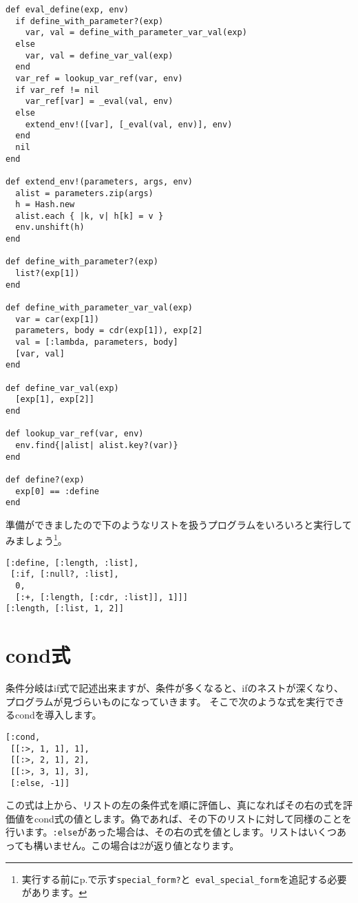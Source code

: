 \begin{lstlisting}
def eval_define(exp, env)
  if define_with_parameter?(exp)
    var, val = define_with_parameter_var_val(exp)
  else
    var, val = define_var_val(exp)
  end
  var_ref = lookup_var_ref(var, env)
  if var_ref != nil
    var_ref[var] = _eval(val, env)
  else
    extend_env!([var], [_eval(val, env)], env)
  end
  nil
end

def extend_env!(parameters, args, env)
  alist = parameters.zip(args)
  h = Hash.new
  alist.each { |k, v| h[k] = v }
  env.unshift(h)
end

def define_with_parameter?(exp)
  list?(exp[1])
end

def define_with_parameter_var_val(exp)
  var = car(exp[1])
  parameters, body = cdr(exp[1]), exp[2]
  val = [:lambda, parameters, body]
  [var, val]
end

def define_var_val(exp)
  [exp[1], exp[2]]
end

def lookup_var_ref(var, env)
  env.find{|alist| alist.key?(var)}
end  

def define?(exp)
  exp[0] == :define
end
\end{lstlisting}

準備ができましたので下のようなリストを扱うプログラムをいろいろと実行してみましょう\footnote{実行する前にp.\pageref{sec:quote}で示す{\tt special\_form?}と{\tt 
eval\_special\_form}を追記する必要があります。}。

\begin{lstlisting}
[:define, [:length, :list], 
 [:if, [:null?, :list], 
  0, 
  [:+, [:length, [:cdr, :list]], 1]]]
[:length, [:list, 1, 2]]
\end{lstlisting}

\section{cond式}

条件分岐はif式で記述出来ますが、条件が多くなると、ifのネストが深くなり、プログラムが見づらいものになっていきます。
そこで次のような式を実行できるcondを導入します。

\begin{lstlisting}
[:cond, 
 [[:>, 1, 1], 1],
 [[:>, 2, 1], 2],
 [[:>, 3, 1], 3],
 [:else, -1]]
\end{lstlisting}

この式は上から、リストの左の条件式を順に評価し、真になればその右の式を評価値をcond式の値とします。偽であれば、その下のリストに対して同様のことを行います。{\tt :else}があった場合は、その右の式を値とします。リストはいくつあっても構いません。この場合は2が返り値となります。

